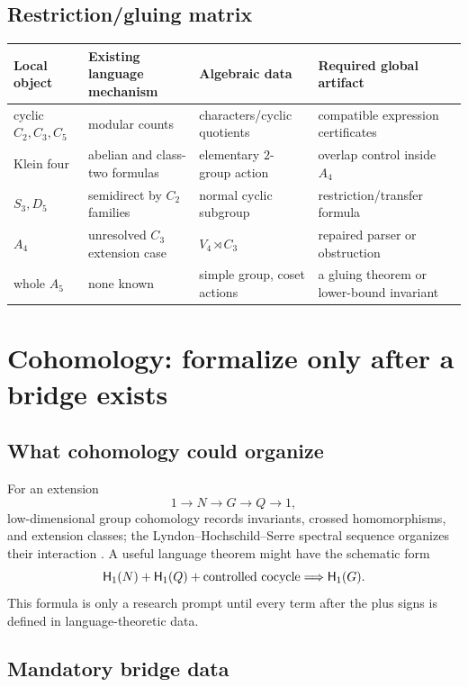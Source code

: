 \documentclass{amsart}
\begin{document}
\subsection{Restriction/gluing matrix}

\begin{center}
\begin{tabularx}{0.96\textwidth}{@{}lXXX@{}}
\toprule
Local object & Existing language mechanism & Algebraic data & Required global artifact\\
\midrule
cyclic $C_2,C_3,C_5$ & modular counts & characters/cyclic quotients & compatible expression certificates\\
Klein four & abelian and class-two formulas & elementary $2$-group action & overlap control inside $A_4$\\
$S_3,D_5$ & semidirect by $C_2$ families & normal cyclic subgroup & restriction/transfer formula\\
$A_4$ & unresolved $C_3$ extension case & $V_4\rtimes C_3$ & repaired parser or obstruction\\
whole $A_5$ & none known & simple group, coset actions & a gluing theorem or lower-bound invariant\\
\bottomrule
\end{tabularx}
\end{center}

\section{Cohomology: formalize only after a bridge exists}

\subsection{What cohomology could organize}

For an extension
\[
1\longrightarrow N\longrightarrow G\longrightarrow Q\longrightarrow 1,
\]
low-dimensional group cohomology records invariants, crossed homomorphisms, and extension classes; the Lyndon--Hochschild--Serre spectral sequence organizes their interaction \cite{brown1982cohomology,weibel1994homological}.  A useful language theorem might have the schematic form
\[
\mathsf{H}_{1}(N)+\mathsf{H}_{1}(Q)+\text{controlled cocycle}
\Longrightarrow \mathsf{H}_{1}(G).
\]
This formula is only a research prompt until every term after the plus signs is defined in language-theoretic data.

\subsection{Mandatory bridge data}
\end{document}
